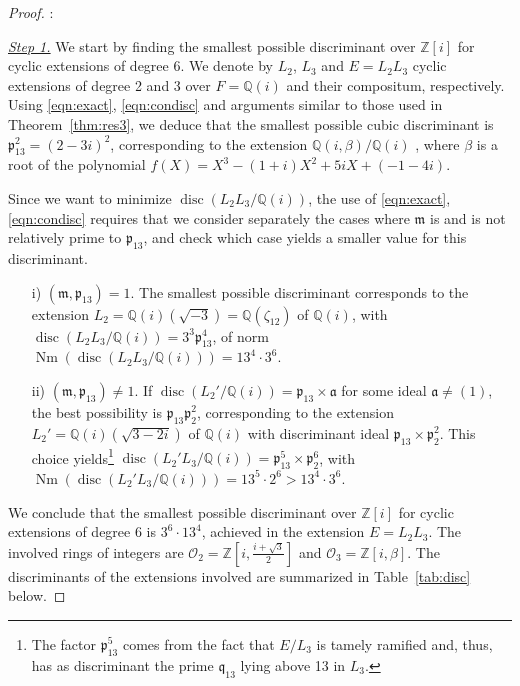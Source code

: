 \documentclass[smallextended]{svjour3}
\newcommand{\Q}{\mathbb{Q}}
\newcommand{\Z}{\mathbb{Z}}
\newcommand{\Irr}{{\rm Irr}}
\newcommand{\Or}{\mathcal{O}}
\DeclareMathOperator{\Nm}{Nm}
\DeclareMathOperator{\disc}{disc}
\begin{document}
\begin{proof}:

\noindent\emph{\underline{Step 1.}} 
We start by finding the smallest possible discriminant over $\Z[i]$ for cyclic extensions of degree 6. We denote by $L_2$, $L_3$ and $E = L_2L_3$ cyclic extensions of degree 2 and 3 over $F = \Q(i)$ and their compositum, respectively. Using \eqref{eqn:exact}, \eqref{eqn:condisc} and arguments similar to those used in Theorem~\ref{thm:res3}, we deduce that the smallest possible cubic discriminant is $\mathfrak p_{13}^2 = (2-3i)^2$, corresponding to the extension $\Q(i, \beta)/\Q(i)$ \cite[Table p. 883, row 32]{BeMOl}, where $\beta$ is a root of the polynomial $f(X) = X^3-(1+i)X^2+5iX+(-1-4i)$.

Since we want to minimize $\disc(L_2 L_3/\Q(i))$, the use of \eqref{eqn:exact}, \eqref{eqn:condisc} requires that we consider separately the cases where $\mathfrak m$ is and is not relatively prime to $\mathfrak p_{13}$, and check which case yields a smaller value for this discriminant.
\begin{itemize}
	\item[i)] $(\mathfrak m, \mathfrak p_{13}) = 1$. The smallest possible discriminant corresponds to the extension $L_2=\Q(i)(\sqrt{-3}) =\Q(\zeta_{12})$ of $\Q(i)$, with $\disc(L_2L_3/\Q(i)) = 3^3\mathfrak p_{13}^4$, of norm $\Nm(\disc(L_2L_3/\Q(i))) = 13^4\cdot 3^6$.

	\item[ii)] $(\mathfrak m, \mathfrak p_{13}) \neq 1$. If $\disc(L_2'/\Q(i))=\mathfrak p_{13}\times \mathfrak a$ for some ideal $\mathfrak a \ne(1)$, the best possibility is $\mathfrak p_{13}\mathfrak p_2^2$, corresponding to the extension $L_2'=\Q(i)(\sqrt{3-2i})$ of $\Q(i)$ with discriminant ideal $\mathfrak p_{13}\times \mathfrak p_2^2$. This choice yields\footnote{The factor $\mathfrak p_{13}^5$ comes from the fact that $E/L_3$ is tamely ramified and, thus, has  as discriminant the prime $\mathfrak q_{13}$ lying above 13 in $L_3$.} $\disc(L_2'L_3/\Q(i)) = \mathfrak p_{13}^5\times \mathfrak p_2^6$, with $\Nm(\disc(L_2'L_3/\Q(i))) = 13^5\cdot 2^6 > 13^4\cdot 3^6$.
\end{itemize}

We conclude that the smallest possible discriminant over $\Z[i]$ for cyclic extensions of degree 6 is $3^6 \cdot 13^4$, achieved in the extension $E = L_2L_3$. The involved rings of integers are $\Or_{2} = \Z\left [i, \frac{i+\sqrt{3}}{2}\right]$
and $ \Or_{3} = \Z[i, \beta]$. 
The discriminants of the extensions involved are summarized in Table~\ref{tab:disc} below. 


\end{proof}
\end{document}
